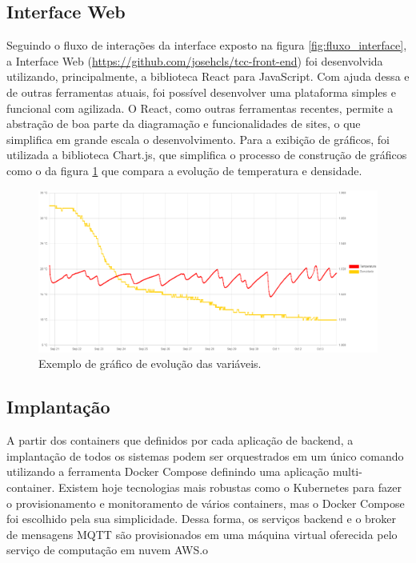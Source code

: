 \subsection{Interface Web}


Seguindo o fluxo de interações da interface exposto na figura \ref{fig:fluxo_interface}, a Interface Web (\url{https://github.com/josehcls/tcc-front-end}) foi desenvolvida utilizando, principalmente, a biblioteca React para JavaScript. Com ajuda dessa e de outras ferramentas atuais, foi possível desenvolver uma plataforma simples e funcional com agilizada. O React, como outras ferramentas recentes, permite a abstração de boa parte da diagramação e funcionalidades de sites, o que simplifica em grande escala o desenvolvimento. Para a exibição de gráficos, foi utilizada a biblioteca Chart.js, que simplifica o processo de construção de gráficos como o da figura \ref{fig:grafico_chart} que compara a evolução de temperatura e densidade.


\begin{figure}[h]
    \centering
    \includegraphics[scale=0.4]{figuras/implementacao/software/grafico_chartjs.PNG}
    \caption{Exemplo de gráfico de evolução das variáveis.}
    \label{fig:grafico_chart}
\end{figure}


\subsection{Implantação}


A partir dos containers que definidos por cada aplicação de backend, a implantação de todos os sistemas podem ser orquestrados em um único comando utilizando a ferramenta Docker Compose definindo uma aplicação multi-container. Existem hoje tecnologias mais robustas como o Kubernetes para fazer o provisionamento e monitoramento de vários containers, mas o Docker Compose foi escolhido pela sua simplicidade. Dessa forma, os serviços backend e o broker de mensagens MQTT são provisionados em uma máquina virtual oferecida pelo serviço de computação em nuvem AWS.o


